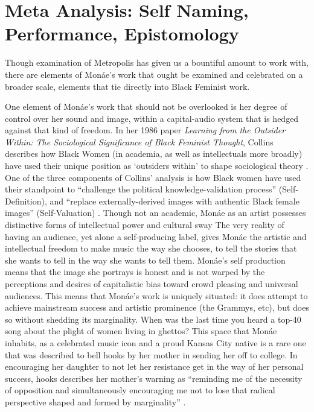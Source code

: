 \documentclass[a4paper, 11pt]{article} %
\begin{document}



\section*{Meta Analysis: Self Naming, Performance, Epistomology}

Though examination of Metropolis has given us a bountiful amount to work with, there are elements of Mon\'ae's work that ought be examined and celebrated on a broader scale, elements that tie directly into Black Feminist work.

One element of Mon\'ae's work that should not be overlooked is her degree of control over her sound and image, within a capital-audio system that is hedged against that kind of freedom.
In her 1986 paper \emph{Learning from the Outsider Within: The Sociological Significance of Black Feminist Thought}, Collins describes how Black Women (in academia, as well as intellectuals more broadly) have used their unique position as `outsiders within' to shape sociological theory \cite{collins86}.
One of the three components of Collins' analysis is how Black women have used their standpoint to ``challenge the political knowledge-validation process'' (Self-Definition), and ``replace externally-derived images with authentic Black female images'' (Self-Valuation) \cite{collins86}.
Though not an academic, Mon\'ae as an artist possesses distinctive forms of intellectual power and cultural sway
The very reality of having an audience, yet alone a self-producing label, gives Mon\'ae the artistic and intellectual freedom to make music the way she chooses, to tell the stories that she wants to tell in the way she wants to tell them.
Mon\'ae's self production means that the image she portrays is honest and is not warped by the perceptions and desires of capitalistic bias toward crowd pleasing and universal audiences.
This means that Mon\'ae's work is uniquely situated: it does attempt to achieve mainstream success and artistic prominence (the Grammys, etc), but does so without shedding its marginality.
When was the last time you heard a top-40 song about the plight of women living in ghettos?
This space that Mon\'ae inhabits, as a celebrated music icon and a proud Kansas City native is a rare one that was described to bell hooks by her mother in sending her off to college.
In encouraging her daughter to not let her resistance get in the way of her personal success, hooks describes her mother's warning as ``reminding me of the necessity of opposition and simultaneously encouraging me not to lose that radical perspective shaped and formed by marginality'' \cite{hookschoosing}.
\end{document}
